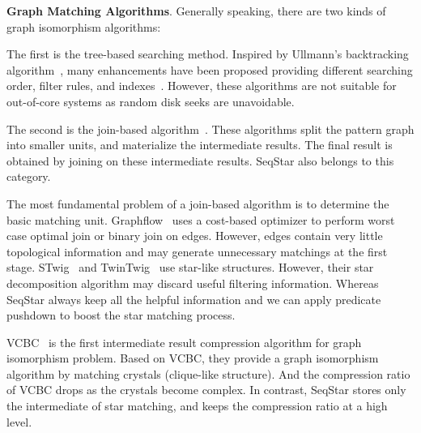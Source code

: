 \textbf{Graph Matching Algorithms}.
Generally speaking, there are two kinds of graph isomorphism algorithms:

The first is the tree-based searching method.
Inspired by Ullmann's backtracking algorithm~\cite{DBLP:journals/jacm/Ullmann76},
many enhancements have been proposed providing different searching order, filter rules, and indexes~\cite{DBLP:journals/pami/CordellaFSV04,DBLP:journals/pvldb/ShangZLY08,DBLP:conf/sigmod/HeS08,DBLP:conf/sigmod/HanLL13,DBLP:journals/pvldb/ZhaoH10,DBLP:journals/pvldb/LeeHKL12}.
However, these algorithms are not suitable for out-of-core systems as random disk seeks are unavoidable.

The second is the join-based algorithm~\cite{DBLP:journals/pvldb/LaiQLC15,DBLP:journals/pvldb/QiaoZC17,DBLP:journals/pvldb/SunWWSL12,DBLP:journals/pvldb/MhedhbiS19,DBLP:journals/pvldb/LinMPS16,DBLP:journals/pvldb/AmmarMSJ18}.
These algorithms split the pattern graph into smaller units,
and materialize the intermediate results.
The final result is obtained by joining on these intermediate results.
SeqStar also belongs to this category.

The most fundamental problem of a join-based algorithm is to determine the basic matching unit.
Graphflow~\cite{DBLP:journals/pvldb/MhedhbiS19} uses a cost-based optimizer to perform worst case optimal join or binary join on edges.
However, edges contain very little topological information and may generate unnecessary matchings at the first stage.
STwig~\cite{DBLP:journals/pvldb/SunWWSL12} and TwinTwig~\cite{DBLP:journals/pvldb/LaiQLC15} use star-like structures.
However, their star decomposition algorithm may discard useful filtering information.
Whereas SeqStar always keep all the helpful information and we can apply predicate pushdown to boost the star matching process.

VCBC~\cite{DBLP:journals/pvldb/QiaoZC17} is the first intermediate result compression algorithm for graph isomorphism problem.
Based on VCBC, they provide a graph isomorphism algorithm by matching crystals (clique-like structure).
And the compression ratio of VCBC drops as the crystals become complex.
In contrast, SeqStar stores only the intermediate of star matching, and keeps the compression ratio at a high level.

